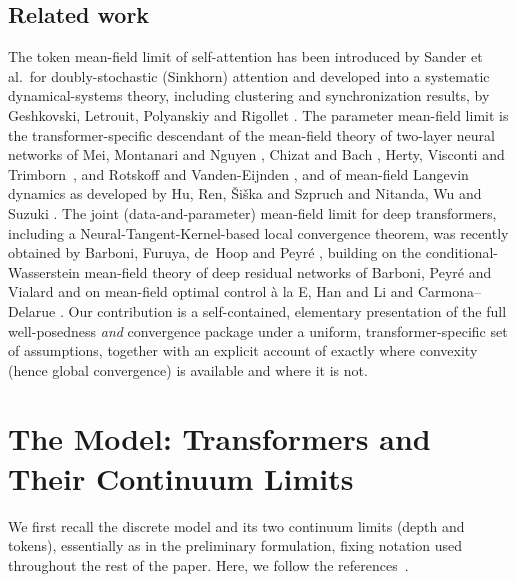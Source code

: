 \documentclass[11pt,a4wide]{article}
\theoremstyle{definition}
\begin{document}
\subsection{Related work}
The token mean-field limit of self-attention has been introduced by Sander et al.\ for doubly-stochastic (Sinkhorn) attention \cite{sander2022sinkformers} and developed into a systematic dynamical-systems theory, including clustering and synchronization results, by Geshkovski, Letrouit, Polyanskiy and Rigollet \cite{geshkovski2023emergence,geshkovski2025mathematical}. The parameter mean-field limit is the transformer-specific descendant of the mean-field theory of two-layer neural networks of Mei, Montanari and Nguyen \cite{mei2018meanfield}, Chizat and Bach \cite{chizat2018global}, Herty, Visconti and Trimborn~\cite{hvt}, and Rotskoff and Vanden-Eijnden \cite{rotskoff2018parameters}, and of mean-field Langevin dynamics as developed by Hu, Ren, {\v S}i{\v s}ka and Szpruch \cite{hu2021meanfield} and Nitanda, Wu and Suzuki \cite{nitanda2022convex}. The joint (data-and-parameter) mean-field limit for deep transformers, including a Neural-Tangent-Kernel-based local convergence theorem, was recently obtained by Barboni, Furuya, de~Hoop and Peyr\'e \cite{barboni2026training}, building on the conditional-Wasserstein mean-field theory of deep residual networks of Barboni, Peyr\'e and Vialard \cite{barboni2024understanding} and on mean-field optimal control \`a la E, Han and Li \cite{e2019meanfield} and Carmona--Delarue \cite{carmona2018probabilistic}. Our contribution is a self-contained, elementary presentation of the full well-posedness \emph{and} convergence package under a uniform, transformer-specific set of assumptions, together with an explicit account of exactly where convexity (hence global convergence) is available and where it is not.


\setcounter{tocdepth}{1}


\section{The Model: Transformers and Their Continuum Limits}
\label{sec:model}

We first recall the discrete model and its two continuum limits (depth and tokens), essentially as in the preliminary formulation, fixing notation used throughout the rest of the paper. Here, we follow the references~\cite{geshkovski2023emergence,geshkovski2025mathematical}.  
\end{document}
